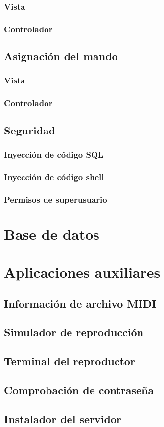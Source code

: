 \subsubsection{Vista}
\subsubsection{Controlador}

\subsection{Asignación del mando}
\subsubsection{Vista}
\subsubsection{Controlador}

\subsection{Seguridad}
\label{subsec:web_seguridad}
\subsubsection{Inyección de código SQL}
\subsubsection{Inyección de código shell}
\subsubsection{Permisos de superusuario}


\section{Base de datos}

\section{Aplicaciones auxiliares}
\subsection{Información de archivo MIDI}
\subsection{Simulador de reproducción}
\label{subsec:simulador_reproduccion}
\subsection{Terminal del reproductor}
\subsection{Comprobación de contraseña}
\label{subsec:aux_login}
\subsection{Instalador del servidor}
